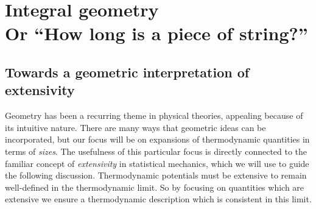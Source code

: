 \section[Integral geometry. Or ``How long is a piece of string?'']{Integral geometry\\ {\large Or ``How long is a piece of string?''}}
\label{sec:integral-geometry}

\subsection{Towards a geometric interpretation of extensivity}

Geometry has been a recurring theme in physical theories, appealing because of its intuitive nature.
There are many ways that geometric ideas can be incorporated, but our focus will be on expansions of thermodynamic quantities in terms of \emph{sizes}.
The usefulness of this particular focus is directly connected to the familiar concept of \emph{extensivity} in statistical mechanics, which we will use to guide the following discussion.
Thermodynamic potentials must be extensive to remain well-defined in the thermodynamic limit.
So by focusing on quantities which are extensive we ensure a thermodynamic description which is consistent in this limit.

